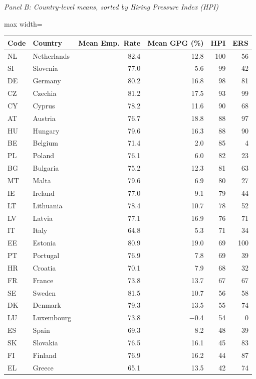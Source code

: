 \documentclass[12pt,a4paper]{article}
\begin{document}
\begin{table}[htbp]
\begin{threeparttable}
\bigskip
\textit{Panel B: Country-level means, sorted by Hiring Pressure Index (HPI)}
\smallskip
\begin{adjustbox}{max width=\textwidth}
\begin{tabular}{llrrrr}
\toprule
Code & Country & Mean Emp.\ Rate & Mean GPG (\%) & HPI & ERS \\
\midrule
NL & Netherlands  & 82.4 & 12.8 & 100 & 56 \\
SI & Slovenia     & 77.0 &  5.6 &  99 & 42 \\
DE & Germany      & 80.2 & 16.8 &  98 & 81 \\
CZ & Czechia      & 81.2 & 17.5 &  93 & 99 \\
CY & Cyprus       & 78.2 & 11.6 &  90 & 68 \\
AT & Austria      & 76.7 & 18.8 &  88 & 97 \\
HU & Hungary      & 79.6 & 16.3 &  88 & 90 \\
BE & Belgium      & 71.4 &  2.0 &  85 &  4 \\
PL & Poland       & 76.1 &  6.0 &  82 & 23 \\
BG & Bulgaria     & 75.2 & 12.3 &  81 & 63 \\
MT & Malta        & 79.6 &  6.9 &  80 & 27 \\
IE & Ireland      & 77.0 &  9.1 &  79 & 44 \\
LT & Lithuania    & 78.4 & 10.7 &  78 & 52 \\
LV & Latvia       & 77.1 & 16.9 &  76 & 71 \\
IT & Italy        & 64.8 &  5.3 &  71 & 34 \\
EE & Estonia      & 80.9 & 19.0 &  69 & 100\\
PT & Portugal     & 76.9 &  7.8 &  69 & 39 \\
HR & Croatia      & 70.1 &  7.9 &  68 & 32 \\
FR & France       & 73.8 & 13.7 &  67 & 67 \\
SE & Sweden       & 81.5 & 10.7 &  56 & 58 \\
DK & Denmark      & 79.3 & 13.5 &  55 & 74 \\
LU & Luxembourg   & 73.8 & $-$0.4 & 54 &  0 \\
ES & Spain        & 69.3 &  8.2 &  48 & 39 \\
SK & Slovakia     & 76.5 & 16.1 &  45 & 83 \\
FI & Finland      & 76.9 & 16.2 &  44 & 87 \\
EL & Greece       & 65.1 & 13.5 &  42 & 74 \\

\end{tabular}
\end{adjustbox}
\end{threeparttable}
\end{table}
\end{document}

